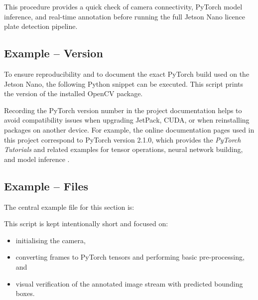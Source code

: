 This procedure provides a quick check of camera connectivity, PyTorch model inference, and real-time annotation before running the full Jetson Nano licence plate detection pipeline.


\subsection{Example -- Version}

To ensure reproducibility and to document the exact PyTorch build used on the Jetson Nano, the following Python snippet can be executed. This script prints the version of the installed OpenCV package.



Recording the PyTorch version number in the project documentation helps to avoid compatibility issues when upgrading JetPack, CUDA, or when reinstalling packages on another device. For example, the online documentation pages used in this project correspond to PyTorch version 2.1.0, which provides the \emph{PyTorch Tutorials} and related examples for tensor operations, neural network building, and model inference \cite{pytorchdocs, paszke2019pytorch}.



\subsection{Example -- Files}

The central example file for this section is:


This script is kept intentionally short and focused on:
\begin{itemize}
	\item initialising the camera,
	\item converting frames to PyTorch tensors and performing basic pre-processing, and
	\item visual verification of the annotated image stream with predicted bounding boxes.
\end{itemize}

